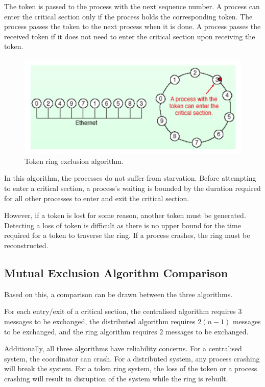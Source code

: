 The token is passed to the process with the next sequence number. A process can enter the critical section only if the process holds the corresponding token. The process passes the token to the next process when it is done. A process passes the received token if it does not need to enter the critical section upon receiving the token. 

\begin{figure}
\centering
\includegraphics[width=0.7\linewidth]{figures/screenshot035}
\caption{Token ring exclusion algorithm.}
\label{fig:screenshot035}
\end{figure}

In this algorithm, the processes do not suffer from starvation. Before attempting to enter a critical section, a process's waiting is bounded by the duration required for all other processes to enter and exit the critical section.

However, if a token is lost for some reason, another token must be generated. Detecting a loss of token is difficult as there is no upper bound for the time required for a token to traverse the ring. If a process crashes, the ring must be reconstructed.

\subsection{Mutual Exclusion Algorithm Comparison}
Based on this, a comparison can be drawn between the three algorithms.

For each entry/exit of a critical section, the centralised algorithm requires $3$ messages to be exchanged, the distributed algorithm requires $2(n-1)$ messages to be exchanged, and the ring algorithm requires $2$ messages to be exchanged.

Additionally, all three algorithms have reliability concerns. For a centralised system, the coordinator can crash. For a distributed system, any process crashing will break the system. For a token ring system, the loss of the token or a process crashing will result in disruption of the system while the ring is rebuilt.

